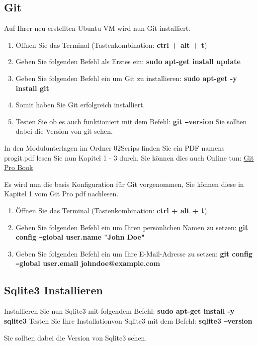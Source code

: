 \subsection{Git}\label{subsec:git}
\begin{frame}[fragile]
    Auf Ihrer neu erstellten Ubuntu VM wird nun Git installiert.
    \begin{enumerate}
        \item Öffnen Sie das Terminal (Tastenkombination: \textbf{ctrl + alt + t})
        \item Geben Sie folgenden Befehl als Erstes ein: \textbf{sudo apt-get install update}
        \item Geben Sie folgenden Befehl ein um Git zu installieren: \textbf{sudo apt-get -y install git}
        \item Somit haben Sie Git erfolgreich installiert.
        \item Testen Sie ob es auch funktioniert mit dem Befehl: \textbf{git \texttt{--}version} Sie sollten dabei 
        die Version von git sehen.
    \end{enumerate}
    In den Modulunterlagen im Ordner 02\textunderscore Scrips finden Sie ein PDF namens progit.pdf lesen Sie nun
    Kapitel 1 - 3 durch.
    Sie können dies auch Online tun: \href{https://git-scm.com/book/en/v2}{Git Pro Book}

    Es wird nun die basis Konfiguration für Git vorgenommen, Sie können diese in Kapitel 1 vom Git Pro pdf nachlesen.
    \begin{enumerate}
        \item Öffnen Sie das Terminal (Tastenkombination: \textbf{ctrl + alt + t})
        \item Geben Sie folgenden Befehl ein um Ihren persönlichen Namen zu setzen: \newline\textbf{git config \texttt{--}global user.name "John Doe"}
        \item Geben Sie folgenden Befehl ein um Ihre E-Mail-Adresse zu setzen: \newline\textbf{git config \texttt{--}global user.email johndoe@example.com}
    \end{enumerate}
\end{frame}

\subsection{Sqlite3 Installieren}\label{subsec:sqlite3}
\begin{frame}[fragile]
    Installieren Sie nun Sqlite3 mit folgendem Befehl: \textbf{sudo apt-get install -y sqlite3}\newline
    Testen Sie Ihre Installationvon Sqlite3 mit dem Befehl: \textbf{sqlite3 \texttt{--}version}

    Sie sollten dabei die Version von Sqlite3 sehen.
\end{frame}

